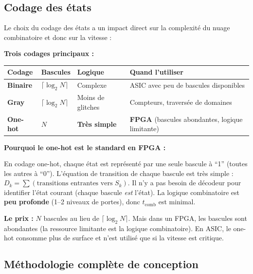 \documentclass[12pt,a4paper,twoside]{book}
\begin{document}
\subsection{Codage des états}

Le choix du codage des états a un impact direct sur la complexité du nuage combinatoire et donc sur la vitesse :

\begin{formule}
\textbf{Trois codages principaux :}

\begin{center}
\renewcommand{\arraystretch}{1.4}
\begin{tabular}{p{2.5cm}p{2cm}p{2.5cm}p{5.5cm}}
\toprule
\textbf{Codage} & \textbf{Bascules} & \textbf{Logique} & \textbf{Quand l'utiliser} \\
\midrule
\textbf{Binaire} & $\lceil\log_2 N\rceil$ & Complexe & ASIC avec peu de bascules disponibles \\
\textbf{Gray} & $\lceil\log_2 N\rceil$ & Moins de glitches & Compteurs, traversée de domaines \\
\textbf{One-hot} & $N$ & \textbf{Très simple} & \textbf{FPGA} (bascules abondantes, logique limitante) \\
\bottomrule
\end{tabular}
\end{center}
\end{formule}

\begin{intuition}
\textbf{Pourquoi le one-hot est le standard en FPGA :}

En codage one-hot, chaque état est représenté par une seule bascule à ``1'' (toutes les autres à ``0''). L'équation de transition de chaque bascule est très simple : $D_k = \sum(\text{transitions entrantes vers } S_k)$. Il n'y a pas besoin de décodeur pour identifier l'état courant (chaque bascule \textit{est} l'état). La logique combinatoire est \textbf{peu profonde} (1--2 niveaux de portes), donc $t_{\text{comb}}$ est minimal.

\textbf{Le prix :} $N$ bascules au lieu de $\lceil\log_2 N\rceil$. Mais dans un FPGA, les bascules sont abondantes (la ressource limitante est la logique combinatoire). En ASIC, le one-hot consomme plus de surface et n'est utilisé que si la vitesse est critique.
\end{intuition}

\subsection{Méthodologie complète de conception}
\end{document}
